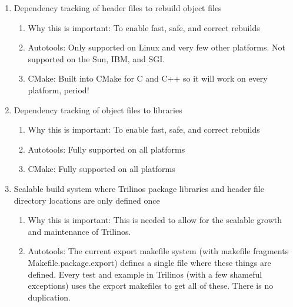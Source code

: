 \documentclass[pdf,ps2pdf,11pt]{SANDreport}
\begin{document}
\begin{enumerate}

{}\item Dependency tracking of header files to rebuild object files

  \begin{enumerate}

  {}\item Why this is important: To enable fast, safe, and correct rebuilds

  {}\item Autotools: Only supported on Linux and very few other
  platforms.  Not supported on the Sun, IBM, and SGI.

  {}\item CMake: Built into CMake for C and C++ so it will work on
  every platform, period!

  \end{enumerate}

{}\item Dependency tracking of object files to libraries

  \begin{enumerate}

  {}\item Why this is important: To enable fast, safe, and correct rebuilds

  {}\item Autotools: Fully supported on all platforms

  {}\item CMake: Fully supported on all platforms

  \end{enumerate}

{}\item Scalable build system where Trilinos package libraries and
header file directory locations are only defined once

  \begin{enumerate}

  {}\item Why this is important: This is needed to allow for the
  scalable growth and maintenance of Trilinos.

  {}\item Autotools: The current export makefile system (with makefile
  fragments Makefile.package.export) defines a single file where these
  things are defined.  Every test and example in Trilinos (with a few
  shameful exceptions) uses the export makefiles to get all of these.
  There is no duplication.


\end{enumerate}
\end{enumerate}
\end{document}
